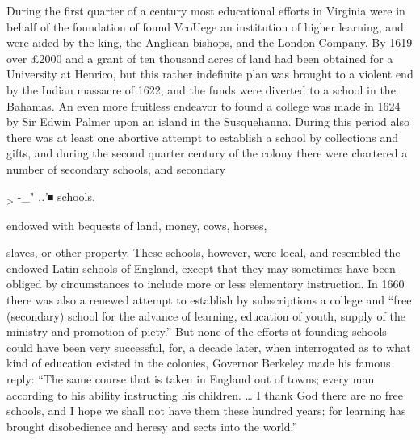 \documentclass[
]{book}
\begin{document}
During the first quarter of a century most educational efforts in Virginia were in behalf of the foundation of found VcoUege an institution of higher learning, and were aided by the king, the Anglican bishops, and the London Company. By 1619 over £2000 and a grant of ten thousand acres of land had been obtained for a University at Henrico, but this rather indefinite plan was brought to a violent end by the Indian massacre of 1622, and the funds were diverted to a school in the Bahamas. An even more fruitless endeavor to found a college was made in 1624 by Sir Edwin Palmer upon an island in the Susquehanna. During this period also there was at least one abortive attempt to establish a school by collections and gifts, and during the second quarter century of the colony there were chartered a number of secondary schools, and secondary

\textsubscript{\textgreater{}} -\_" \emph{..'■} schools.

endowed with bequests of land, money, cows, horses,

slaves, or other property. These schools, however, were local, and resembled the endowed Latin schools of England, except that they may sometimes have been obliged by circumstances to include more or less elementary instruction. In 1660 there was also a renewed attempt to establish by subscriptions a college and ``free (secondary) school for the advance of learning, education of youth, supply of the ministry and promotion of piety.'' But none of the efforts at founding schools could have been very successful, for, a decade later, when interrogated as to what kind of education existed in the colonies, Governor Berkeley made his famous reply: ``The same course that is taken in England out of towns; every man according to his ability instructing his children. \ldots{} I thank God there are no free schools, and I hope we shall not have them these hundred years; for learning has brought disobedience and heresy and sects into the world.''
\end{document}
